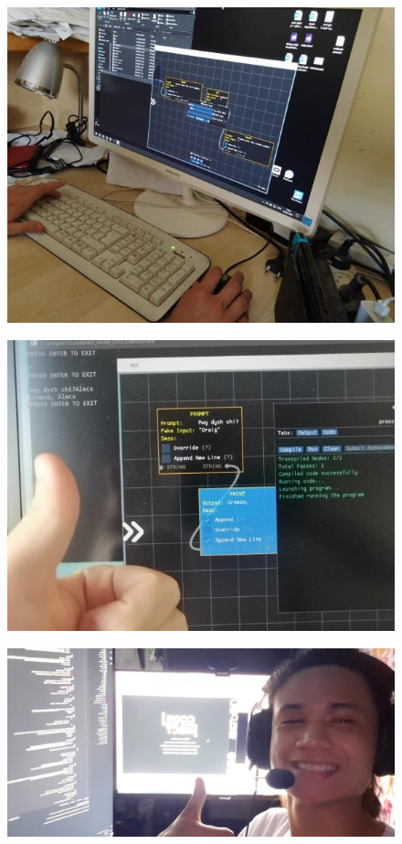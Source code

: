 \clearpage
{}

\begin{figure}[H]
	 \centering
	 \includegraphics[width=\textwidth]{evaluators/d_sr.jpg}
\end{figure}
\begin{figure}[H]
	 \centering
	 \includegraphics[width=\textwidth]{evaluators/d_a13.jpg}
\end{figure}
\begin{figure}[H]
	 \centering
	 \includegraphics[width=\textwidth]{evaluators/f_un.jpg}
\end{figure}
